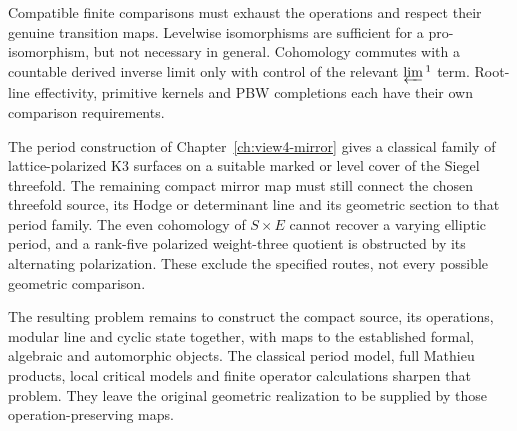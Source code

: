 Compatible finite comparisons must exhaust the operations and
respect their genuine transition maps. Levelwise isomorphisms are
sufficient for a pro-isomorphism, but not necessary in general.
Cohomology commutes with a countable derived inverse limit only
with control of the relevant \(\varprojlim{}^1\) term.
Root-line effectivity, primitive kernels and PBW completions each
have their own comparison requirements.

The period construction of Chapter~\ref{ch:view4-mirror} gives a
classical family of lattice-polarized K3 surfaces on a suitable
marked or level cover of the Siegel threefold. The remaining
compact mirror map must still connect
the chosen threefold source, its Hodge or determinant line and its
geometric section to that period family. The even cohomology of
\(S\times E\) cannot recover a varying elliptic period, and a
rank-five polarized weight-three quotient is obstructed by its
alternating polarization. These exclude the specified routes,
not every possible geometric comparison.

The resulting problem remains to construct the compact source,
its operations, modular line and cyclic state together, with maps
to the established formal, algebraic and automorphic objects.
The classical period model, full Mathieu products, local critical
models and finite operator calculations sharpen that problem.
They leave the original geometric realization to be supplied by
those operation-preserving maps.
